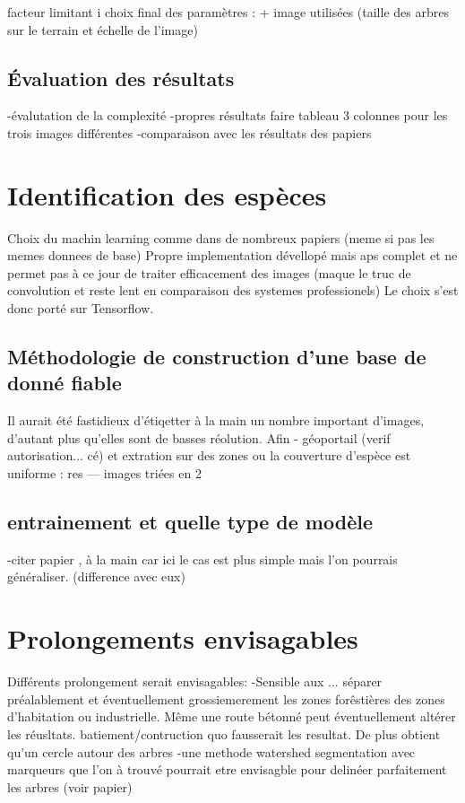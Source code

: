 \documentclass{article}
\begin{document}
		facteur limitant i
		choix final des paramètres : + image utilisées (taille des arbres sur le terrain et échelle de l'image) 

	\subsection{\'{E}valuation des résultats}
		-évalutation de la complexité 
		-propres résultats
		faire tableau 3 colonnes pour les trois images différentes
		-comparaison avec les résultats des papiers 

\section{Identification des espèces}

	Choix du machin learning comme dans de nombreux papiers (meme si pas les memes donnees de base) Propre implementation dévellopé mais aps complet et ne permet pas à ce jour de traiter efficacement des images (maque le truc de convolution et reste lent en comparaison des systemes professionels) Le choix s'est donc porté sur Tensorflow.  

	\subsection{Méthodologie de construction d'une base de donné fiable}
		Il aurait été fastidieux d'étiqetter à la main un nombre important d'images, d'autant plus qu'elles sont de basses réolution. Afin   
		- géoportail (verif autorisation... cé) et extration sur des zones ou la couverture d'espèce est uniforme : res --- images triées en 2
	
	\subsection{entrainement et quelle type de modèle }
		-citer papier , à la main car ici le cas est plus simple mais l'on pourrais généraliser. (difference avec eux)

\section{Prolongements envisagables}

	Différents prolongement serait envisagables: 
	-Sensible aux ... séparer préalablement et éventuellement grossiemerement les zones forêstières des zones d'habitation ou  industrielle. Même une route bétonné peut éventuellement altérer les réusltats. batiement/contruction quo fausserait les resultat. 
	De plus obtient qu'un cercle autour des arbres
	-une methode watershed segmentation avec marqueurs que l'on à trouvé pourrait etre envisagble pour delinéer parfaitement les arbres (voir papier) 
\end{document}
